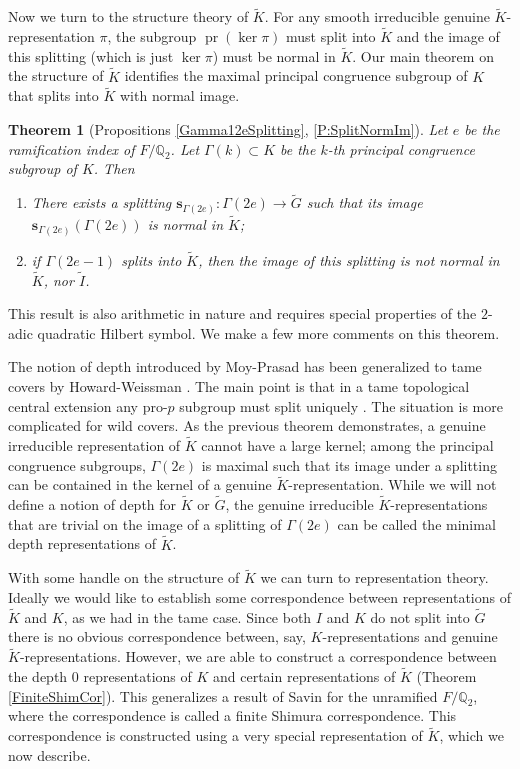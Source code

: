 \documentclass[10pt, letterpaper]{amsart}
\theoremstyle{plain}
\newtheorem{Thm}[equation]{Theorem}
\theoremstyle{definition}
\numberwithin{equation}{section}
\newcommand{\pr}{\operatorname{pr}}
\newcommand{\Gt}{\widetilde{G}}
\newcommand{\It}{\widetilde{I}}
\newcommand{\Kt}{\widetilde{K}}
\newcommand{\s}{\mathbf{s}}
\begin{document}
Now we turn to the structure theory of $\Kt$. For any smooth irreducible genuine $\Kt$-representation $\pi$, the subgroup $\pr(\ker\pi)$ must split into $\Kt$ and the image of this splitting (which is just $\ker\pi$) must be normal in $\Kt$. Our main theorem on the structure of $\Kt$ identifies the maximal principal congruence subgroup of $K$ that splits into $\Kt$ with normal image.

\begin{Thm}[Propositions \ref{Gamma12eSplitting}, \ref{P:SplitNormIm}]
    Let $e$ be the ramification index of $F/\mathbb{Q}_{2}$. Let $\Gamma(k)\subset K$ be the $k$-th principal congruence subgroup of $K$. Then
    \begin{enumerate}
        \item There exists a splitting $\s_{\Gamma(2e)}:\Gamma(2e)\rightarrow \Gt$ such that its image $\s_{\Gamma(2e)}(\Gamma(2e))$ is normal in $\Kt$;
        \item if $\Gamma(2e-1)$ splits into $\Kt$, then the image of this splitting is not normal in $\Kt$, nor $\It$.
    \end{enumerate}
\end{Thm}
This result is also arithmetic in nature and requires special properties of the $2$-adic quadratic Hilbert symbol. We make a few more comments on this theorem.

The notion of depth introduced by Moy-Prasad \cite{MP94,MP96} has been generalized to tame covers by Howard-Weissman \cite{HW09}. The main point is that in a tame topological central extension any pro-$p$ subgroup must split uniquely \cite[Proposition 2.3]{HW09}. The situation is more complicated for wild covers. As the previous theorem demonstrates, a genuine irreducible representation of $\Kt$ cannot have a large kernel; among the principal congruence subgroups, $\Gamma(2e)$ is maximal such that its image under a splitting can be contained in the kernel of a genuine $\Kt$-representation. While we will not define a notion of depth for $\Kt$ or $\Gt$, the genuine irreducible $\Kt$-representations that are trivial on the image of a splitting of $\Gamma(2e)$ can be called the minimal depth representations of $\Kt$. 

With some handle on the structure of $\Kt$ we can turn to representation theory. Ideally we would like to establish some correspondence between representations of $\Kt$ and $K$, as we had in the tame case. Since both $I$ and $K$ do not split into $\Gt$ there is no obvious correspondence between, say, $K$-representations and genuine $\Kt$-representations. However, we are able to construct a correspondence between the depth $0$ representations of $K$ and certain representations of $\Kt$ (Theorem \ref{FiniteShimCor}). This generalizes a result of Savin \cite{S12} for the unramified $F/\mathbb{Q}_{2}$, where the correspondence is called a finite Shimura correspondence. This correspondence is constructed using a very special representation of $\Kt$, which we now describe.
\end{document}
